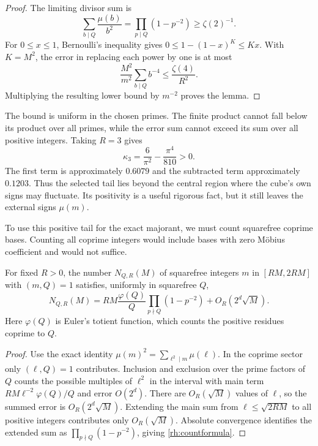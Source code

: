 \begin{proof}
The limiting divisor sum is
\[
\sum_{b\mid Q}\frac{\mu(b)}{b^2}
=\prod_{p\mid Q}(1-p^{-2})\ge\zeta(2)^{-1}.
\]
For \(0\le x\le1\), Bernoulli's inequality gives
\(0\le1-(1-x)^K\le Kx\). With \(K=M^2\), the error in replacing each power by one is at most
\[
\frac{M^2}{m^2}\sum_{b\mid Q}b^{-4}
\le\frac{\zeta(4)}{R^2}.
\]
Multiplying the resulting lower bound by \(m^{-2}\) proves the lemma.
\end{proof}

The bound is uniform in the chosen primes. The finite product cannot fall below its product over all primes, while the error sum cannot exceed its sum over all positive integers. Taking \(R=3\) gives
\[
\kappa_3=\frac6{\pi^2}-\frac{\pi^4}{810}>0.
\]
The first term is approximately \(0.6079\) and the subtracted term approximately \(0.1203\). Thus the selected tail lies beyond the central region where the cube's own signs may fluctuate. Its positivity is a useful rigorous fact, but it still leaves the external signs \(\mu(m)\).

To use this positive tail for the exact majorant, we must count squarefree coprime bases. Counting all coprime integers would include bases with zero Möbius coefficient and would not suffice.

\begin{lemma}\label{rh:count}
For fixed \(R>0\), the number \(N_{Q,R}(M)\) of squarefree integers \(m\) in \([RM,2RM]\) with \((m,Q)=1\) satisfies, uniformly in squarefree \(Q\),
\begin{equation}\label{rh:countformula}
N_{Q,R}(M)=RM\frac{\varphi(Q)}Q
\prod_{p\nmid Q}(1-p^{-2})+O_R(2^d\sqrt M).
\end{equation}
Here \(\varphi(Q)\) is Euler's totient function, which counts the positive residues coprime to \(Q\).
\end{lemma}

\begin{proof}
Use the exact identity \(\mu(m)^2=\sum_{\ell^2\mid m}\mu(\ell)\). In the coprime sector only \((\ell,Q)=1\) contributes. Inclusion and exclusion over the prime factors of \(Q\) counts the possible multiples of \(\ell^2\) in the interval with main term
\(RM\ell^{-2}\varphi(Q)/Q\) and error \(O(2^d)\).
There are \(O_R(\sqrt M)\) values of \(\ell\), so the summed error is \(O_R(2^d\sqrt M)\). Extending the main sum from \(\ell\le\sqrt{2RM}\) to all positive integers contributes only \(O_R(\sqrt M)\). Absolute convergence identifies the extended sum as \(\prod_{p\nmid Q}(1-p^{-2})\), giving \eqref{rh:countformula}.
\end{proof}

